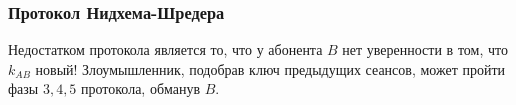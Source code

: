 \begin{frame}
    \frametitle{Протокол Нидхема-Шредера}
    
    \begin{figure}
        \begin{center}
        \end{center}
    \end{figure} 
\end{frame}

Недостатком протокола является то, что у абонента $B$ нет уверенности в том, что $k_{AB}$ новый! Злоумышленник, подобрав ключ предыдущих сеансов, может пройти фазы $3,4,5$ протокола, обманув $B$.

